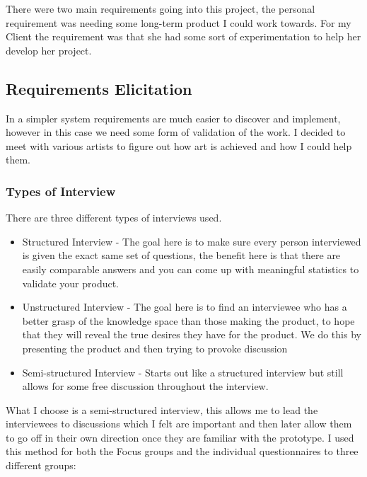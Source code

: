 \documentclass[a4paper]{report}
\begin{document}
There were two main requirements going into this project, the personal requirement was needing some long-term product I could work towards. For my Client the requirement was that she had some sort of experimentation to help her develop her project.

\subsection{Requirements Elicitation}
In a simpler system requirements are much easier to discover and implement, however in this case we need some form of validation of the work. I decided to meet with various artists to figure out how art is achieved and how I could help them.

\subsubsection{Types of Interview}
There are three different types of interviews used.

\begin{itemize}
\item Structured Interview - The goal here is to make sure every person interviewed is given the exact same set of questions, the benefit here is that there are easily comparable answers and you can come up with meaningful statistics to validate your product.

\item Unstructured Interview - The goal here is to find an interviewee who has a better grasp of the knowledge space than those making the product, to hope that they will reveal the true desires they have for the product. We do this by presenting the product and then trying to provoke discussion

\item Semi-structured Interview - Starts out like a structured interview but still allows for some free discussion throughout the interview.
\end{itemize}

What I choose is a semi-structured interview, this allows me to lead the interviewees to discussions which I felt are important and then later allow them to go off in their own direction once they are familiar with the prototype. I used this method for both the Focus groups and the individual questionnaires to three different groups:
\end{document}
